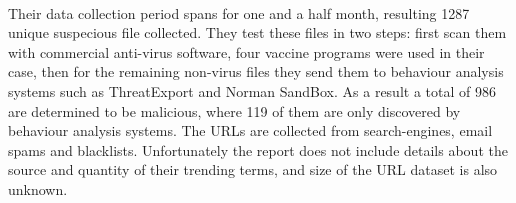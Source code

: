 \paragraph{}
Their data collection period spans for one and a half month, resulting 1287 
unique suspecious file collected. They test these files in two steps: first 
scan them with commercial anti-virus software, four vaccine programs were used 
in their case,  then for the remaining non-virus files they send them to 
behaviour analysis systems such as ThreatExport and Norman SandBox. As a result 
a total of 986 are determined to be malicious, where 119 of them are only 
discovered by behaviour analysis systems. 
The URLs are collected from search-engines, email spams and blacklists. 
Unfortunately the report does not include details about the source and 
quantity of their trending terms, and size of the URL dataset is also unknown. 
